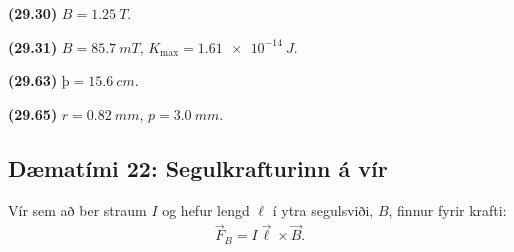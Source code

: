 \begin{tcolorbox}
\begin{enumerate*}[label = ]
  \item \textbf{(29.30)} $B = \SI{1.25}{T}$.
  \item \textbf{(29.31)} $B = \SI{85.7}{mT}$, $K_{\text{max}} = \SI{1.61e-14}{J}$.
  \item \textbf{(29.63)} $þ = \SI{15.6}{cm}$. \\
  \item \textbf{(29.65)} $r = \SI{0.82}{mm}$, $p = \SI{3.0}{mm}$.
\end{enumerate*}
\end{tcolorbox}


\newpage 

\subsection*{Dæmatími 22: Segulkrafturinn á vír}

\begin{tcolorbox}
Vír sem að ber straum $I$ og hefur lengd $\ell$ í ytra segulsviði, $B$, finnur fyrir krafti:
\begin{align*}
    \vec{F}_B = I \vec{\ell} \times \vec{B}.
\end{align*}
\end{tcolorbox}

